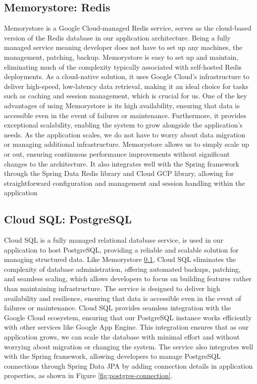 \subsection{Memorystore: Redis}\label{subsection:Memorystore: Redis}

Memorystore \cite{Memorystore} is a Google Cloud-managed Redis service, serves as the cloud-based version of the Redis database in our application architecture. Being a fully managed service meaning developer does not have to set up any machines, the management, patching, backup. Memorystore is easy to set up and maintain, eliminating much of the complexity typically associated with self-hosted Redis deployments. As a cloud-native solution, it uses Google Cloud’s infrastructure to deliver high-speed, low-latency data retrieval, making it an ideal choice for tasks such as caching and session management, which is crucial for us. One of the key advantages of using Memorystore is its high availability, ensuring that data is accessible even in the event of failures or maintenance. Furthermore, it provides exceptional scalability, enabling the system to grow alongside the application's needs. As the application scales, we do not have to worry about data migration or managing additional infrastructure. Memorystore allows us to simply scale up or out, ensuring continuous performance improvements without significant changes to the architecture. It also integrates well with the Spring framework through the Spring Data Redis library and Cloud GCP library, allowing for straightforward configuration and management and session handling within the application

\subsection{Cloud SQL: PostgreSQL}\label{subsection:Cloud SQL: PostgreSQL}

Cloud SQL \cite{Postgres} is a fully managed relational database service, is used in our application to host PostgreSQL, providing a reliable and scalable solution for managing structured data. Like Memorystore \ref{subsection:Memorystore: Redis}, Cloud SQL eliminates the complexity of database administration, offering automated backups, patching, and seamless scaling, which allows developers to focus on building features rather than maintaining infrastructure. The service is designed to deliver high availability and resilience, ensuring that data is accessible even in the event of failures or maintenance. Cloud SQL provides seamless integration with the Google Cloud ecosystem, ensuring that our PostgreSQL instance works efficiently with other services like Google App Engine. This integration ensures that as our application grows, we can scale the database with minimal effort and without worrying about migration or changing the system. The service also integrates well with the Spring framework, allowing developers to manage PostgreSQL connections through Spring Data JPA by adding connection details in application properties, as shown in Figure \ref{fig:postgres-connection}.

